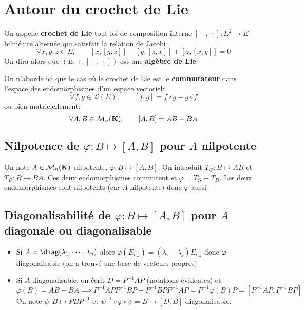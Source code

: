 \section{Autour du crochet de Lie}


\begin{dfn}
    On appelle \textbf{crochet de Lie} tout loi de composition interne $[\,\cdot\,,\,\cdot\,]:E^2\to E$ bilinéaire alternée qui satisfait la relation de Jacobi \[
        \forall x,y,z \in  E,\qquad [x,[y,z]]+[y,[z,x]]+[z,[x,y]]=0
    \]
    On dira alors que $(E, +, [\,\cdot\,,\,\cdot\,])$ est une \textbf{algèbre de Lie}.
\end{dfn}

\begin{rem}
On n'aborde ici que le cas où le crochet de Lie est le \textbf{commutateur} dans l'espace des endomorphismes d'un espace vectoriel: \[
    \forall  f,g \in  \mathcal  L(E),\qquad  [f,g]=f\circ g-g\circ f
\] 
ou bien matriciellement: \[
    \forall  A,B \in  \mathcal  M_n(\mathbf K), \qquad  [A, B]=AB-BA
\] 
\end{rem}

\subsection{Nilpotence de \texorpdfstring{$\varphi: B\longmapsto [A,B]$}{B -> [A,B]} pour $A$ nilpotente}

On note $A\in\mathcal M_n(\mathbf K)$ nilpotente, $\varphi:B\longmapsto [A, B]$. On introduit $T_G:B\longmapsto AB$ et $T_D:B\longmapsto BA$. Ces deux endomorphismes commutent et $\varphi=T_G-T_D$. Les deux endomorphismes sont nilpotents (car $A$ nilpotente) donc $\varphi$ aussi

\subsection{Diagonalisabilité de \texorpdfstring{$\varphi: B\longmapsto [A, B]$}{B -> [A,B]} pour $A$ diagonale ou diagonalisable}

\begin{itemize}
    \item Si $A=\diag (\lambda_1, \cdots, \lambda_n)$ alors $\varphi(E_{i, j})=(\lambda_i-\lambda_j)E_{i,j}$ donc $\varphi$ diagonalisable (on a trouvé une base de vecteurs propres)
    \item Si $A$ diagonalisable, on écrit $D=P^{-1}AP$ (notations évidentes) et \[
            \varphi(B)=AB-BA\implies P^{-1}APP^{-1}BP-P^{-1}BPP^{-1}AP=P^{-1}\varphi(B)P=[P^{-1}AP, P^{-1}BP]
        \]
        On note $\psi:B\longmapsto PBP^{-1}$ et $\psi^{-1}\circ \varphi\circ \psi=B\longmapsto [D, B]$ diagonalisable.
\end{itemize}

